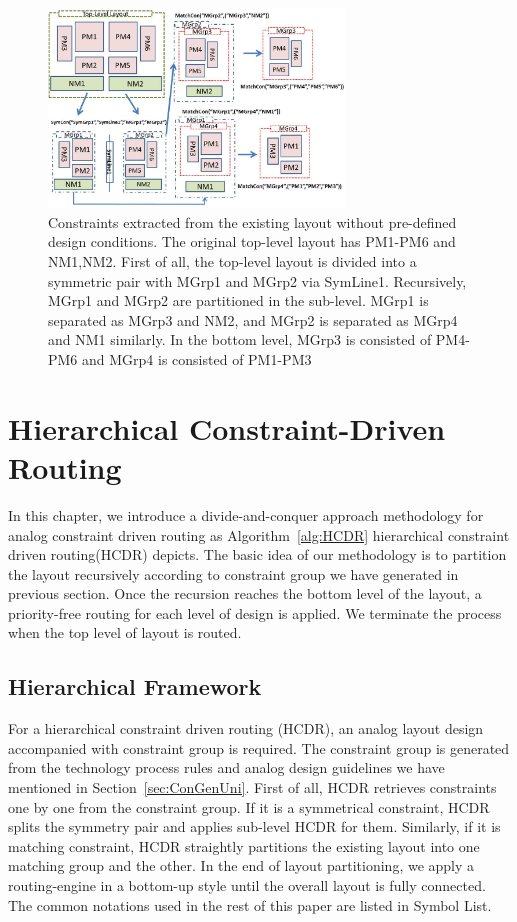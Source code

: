       \begin{figure}[ht]
        \centering
        \includegraphics[width=0.7\textwidth]{Fig/Chapter3/CGExtract.eps}
        \caption{Constraints extracted from the existing layout without pre-defined design conditions. The original top-level layout has PM1-PM6 and NM1,NM2. First of all, the top-level layout is divided into a symmetric pair with MGrp1 and MGrp2 via SymLine1. Recursively, MGrp1 and MGrp2 are partitioned in the sub-level. MGrp1 is separated as MGrp3 and NM2, and MGrp2 is separated as MGrp4 and NM1 similarly. In the bottom level, MGrp3 is consisted of PM4-PM6 and MGrp4 is consisted of PM1-PM3}
        \label{fig:CGExtract}
      \end{figure}

  \section{Hierarchical Constraint-Driven Routing}\label{sec:HCDR}

    In this chapter, we introduce a divide-and-conquer approach methodology for analog constraint driven routing as Algorithm~\ref{alg:HCDR} hierarchical constraint driven routing(HCDR) depicts. The basic idea of our methodology is to partition the layout recursively according to constraint group we have generated in previous section. Once the recursion reaches the bottom level of the layout, a priority-free routing for each level of design is applied. We terminate the process when the top level of layout is routed. 

    \subsection{Hierarchical Framework}\label{sec:HierFramework}

      For a hierarchical constraint driven routing (HCDR), an analog layout design accompanied with constraint group is required. The constraint group is generated from the technology process rules and analog design guidelines we have mentioned in Section~\ref{sec:ConGenUni}. First of all, HCDR retrieves constraints one by one from the constraint group. If it is a symmetrical constraint, HCDR splits the symmetry pair and applies sub-level HCDR for them. Similarly, if it is matching constraint, HCDR straightly partitions the existing layout into one matching group and the other. In the end of layout partitioning, we apply a routing-engine in a bottom-up style until the overall layout is fully connected. The common notations used in the rest of this paper are listed in Symbol List.

